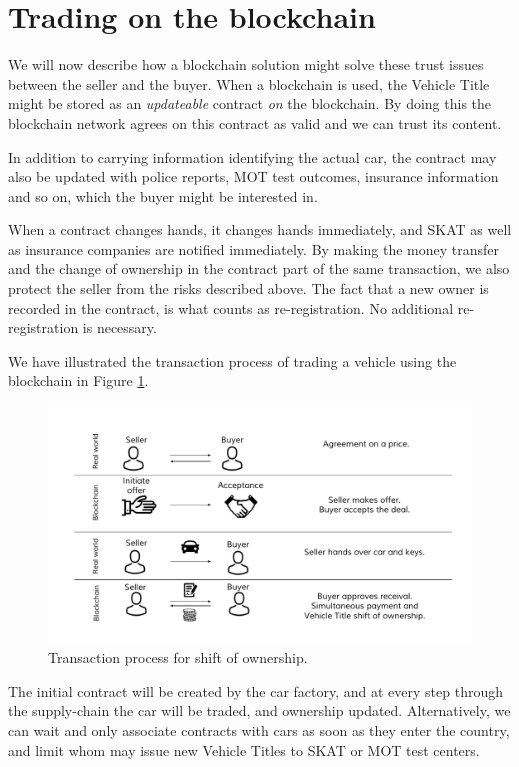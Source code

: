 \documentclass[oneside,a4paper,10pts,article]{memoir}
\begin{document}
\section{Trading on the blockchain}
\label{sec:trading_on_blockchain}
We will now describe how a blockchain solution might solve these trust
issues between the seller and the buyer. When a blockchain is used,
the Vehicle Title might be stored as an \emph{updateable} contract
\emph{on} the blockchain. By doing this the blockchain network agrees
on this contract as valid and we can trust its content.

In addition to carrying information identifying the actual car, the
contract may also be updated with police reports, MOT test outcomes,
insurance information and so on, which the buyer might be interested
in.

When a contract changes hands, it changes hands immediately, and SKAT
as well as insurance companies are notified immediately. By making the
money transfer and the change of ownership in the contract part of the
same transaction, we also protect the seller from the risks described
above. The fact that a new owner is recorded in the contract, is what
counts as re-registration. No additional re-registration is
necessary.

We have illustrated the transaction process of trading a vehicle using
the blockchain in Figure \ref{fig:shift-of-ownership}.

\begin{figure}
  \centering
  \includegraphics[width=\textwidth]{shift-of-ownership.pdf}
  \caption{Transaction process for shift of ownership.}
  \label{fig:shift-of-ownership}
\end{figure}

The initial contract will be created by the car factory, and at every
step through the supply-chain the car will be traded, and ownership
updated. Alternatively, we can wait and only associate contracts with
cars as soon as they enter the country, and limit whom may issue new
Vehicle Titles to SKAT or MOT test centers.
\end{document}
